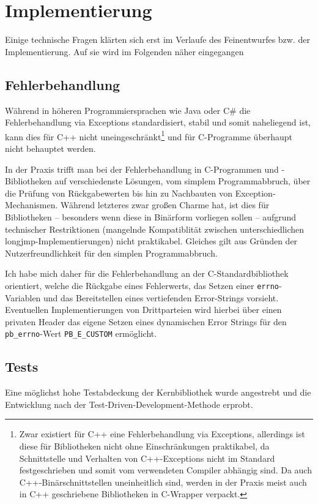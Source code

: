 \section{Implementierung}
Einige technische Fragen klärten sich erst im Verlaufe des Feinentwurfes bzw. der Implementierung.
Auf sie wird im Folgenden näher eingegangen

\subsection{Fehlerbehandlung}
Während in höheren Programmiersprachen wie Java oder C\# die Fehlerbehandlung via Exceptions standardisiert, stabil
und somit naheliegend ist, kann dies für C++ nicht uneingeschränkt\footnote{Zwar existiert für C++ eine Fehlerbehandlung
via Exceptions, allerdings ist diese für Bibliotheken nicht ohne Einschränkungen praktikabel, da Schnittstelle und
Verhalten von C++-Exceptions nicht im Standard festgeschrieben und somit vom verwendeten Compiler abhängig sind.
Da auch C++-Binärschnittstellen uneinheitlich sind, werden in der Praxis meist auch in C++ geschriebene
Bibliotheken in C-Wrapper verpackt.} und für C-Programme überhaupt nicht behauptet werden.

In der Praxis trifft man bei der Fehlerbehandlung in C-Programmen und -Bibliotheken auf verschiedenste Lösungen, vom
simplem Programmabbruch, über die Prüfung von Rückgabewerten bis hin zu Nachbauten von Exception-Mechanismen.
Während letzteres zwar großen Charme hat, ist dies für Bibliotheken -- besonders wenn diese in Binärform vorliegen
sollen -- aufgrund technischer Restriktionen (mangelnde Kompatiblität zwischen unterschiedlichen
longjmp-Implementierungen) nicht praktikabel. Gleiches gilt aus Gründen der Nutzerfreundlichkeit für den simplen
Programmabbruch.

Ich habe mich daher für die Fehlerbehandlung an der C-Standardbibliothek orientiert, welche die Rückgabe eines
Fehlerwerts, das Setzen einer \lstinline{errno}-Variablen und das Bereitstellen eines vertiefenden Error-Strings vorsieht.
Eventuellen Implementierungen von Drittparteien wird hierbei über einen privaten Header das eigene Setzen eines
dynamischen Error Strings für den \lstinline{pb_errno}-Wert \lstinline{PB_E_CUSTOM} ermöglicht.

\subsection{Tests}
Eine möglichst hohe Testabdeckung der Kernbibliothek wurde angestrebt und die Entwicklung nach der
Test-Driven-Development-Methode erprobt.

